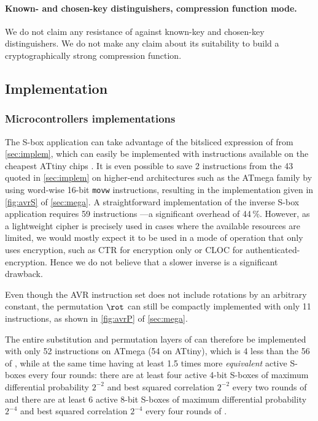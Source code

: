 \paragraph{Known- and chosen-key distinguishers, compression function mode.}
We do not claim any resistance of \fly against known-key and chosen-key distinguishers. We do not make any claim about its suitability
to build a cryptographically strong compression function.

\subsection{Implementation}
\label{sec:flyimplem}


\subsubsection{Microcontrollers implementations}
The S-box application can take advantage of the bitsliced expression of \littlunOne from \autoref{sec:implem}, which can easily be implemented with instructions available on the cheapest ATtiny chips \cite{ATtiny}. It is even possible to save 2 instructions from
the 43 quoted in \autoref{sec:implem} on higher-end architectures such as the ATmega family \cite{ATmega} by using word-wise 16-bit \texttt{movw} instructions,
resulting in the implementation given in \autoref{fig:avrS} of \autoref{sec:mega}. A straightforward implementation of the inverse S-box application requires 59 instructions ---a significant overhead of 44\,\%.
However, as a lightweight cipher is precisely used in cases where the available resources are limited, we would mostly expect it to be used in a mode of operation that only uses encryption,
such as \eg \textsf{CTR} for encryption only or \textsf{CLOC} \cite{cloc} for authenticated-encryption. Hence we do not believe that a slower inverse is a significant drawback.

Even though the AVR instruction set does not include rotations by an arbitrary constant, the permutation $\rot$ can still
be compactly implemented with only 11 instructions, as shown in \autoref{fig:avrP} of \autoref{sec:mega}.

The entire substitution and permutation layers of \fly can therefore be implemented with only 52 instructions on ATmega (54 on ATtiny), which is 4 less than the 56 of \pride \cite{pride},
while at the same time having at least 1.5 times more \emph{equivalent} active S-boxes every four rounds: there are at least four active 4-bit S-boxes of maximum differential probability $2^{-2}$ and
best squared correlation $2^{-2}$ every two rounds of \pride and there are at least 6 active 8-bit S-boxes of maximum differential probability $2^{-4}$ and best squared
correlation $2^{-4}$ every
four rounds of \fly.

